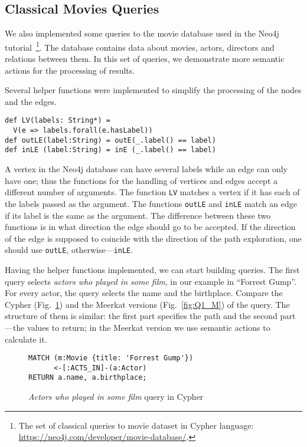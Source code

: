 \subsection{Classical Movies Queries}

We also implemented some queries to the movie database used in the Neo4j tutorial~\footnote{The set of classical queries to movie dataset in Cypher language: \url{https://neo4j.com/developer/movie-database/}.}.
The database contains data about movies, actors, directors and relations between them.
In this set of queries, we demonstrate more semantic actions for the processing of results.

Several helper functions were implemented to simplify the processing of the nodes and the edges.

\begin{lstlisting}
def LV(labels: String*) =
  V(e => labels.forall(e.hasLabel))
def outLE(label:String) = outE(_.label() == label)
def inLE (label:String) = inE (_.label() == label)
\end{lstlisting}

A vertex in the Neo4j database can have several labels while an edge can only have one; thus the functions for the handling of vertices and edges accept a different number of arguments.
The function \lstinline{LV} matches a vertex if it has each of the labels passed as the argument.
The functions \lstinline{outLE} and \lstinline{inLE} match an edge if its label is the same as the argument.
The difference between these two functions is in what direction the edge should go to be accepted.
If the direction of the edge is supposed to coincide with the direction of the path exploration, one should use \lstinline{outLE}, otherwise---\lstinline{inLE}.

Having the helper functions implemented, we can start building queries.
The first query selects \emph{actors who played in some film}, in our example in ``Forrest Gump''.
For every actor, the query selects the name and the birthplace.
Compare the Cypher (Fig.~\ref{fig:Q1_C}) and the Meerkat versions (Fig.~\ref{fig:Q1_M}) of the query.
The structure of them is similar: the first part specifies the path and the second part---the values to return; in the Meerkat version we use semantic actions to calculate it.

\begin{figure}[!h]
\begin{lstlisting}
MATCH (m:Movie {title: 'Forrest Gump'})
      <-[:ACTS_IN]-(a:Actor)
RETURN a.name, a.birthplace;
\end{lstlisting}
\caption{\emph{Actors who played in some film} query in Cypher}
\label{fig:Q1_C}
\end{figure}

